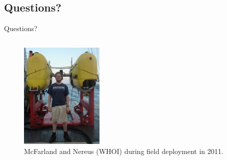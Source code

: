 \subsection{Questions?}
\begin{frame}[t]{Questions?}
\begin{columns}
  \tableofcontents
{}
  \begin{center}
\begin{figure}[htbp]  
  \begin{center}
    \includegraphics[width=40mm]{./pres/images/tophNereus}
  \end{center}
  \caption{McFarland and Nereus (WHOI) during field deployment in 2011.}
\end{figure}
\end{center}
\end{columns}

\end{frame}
